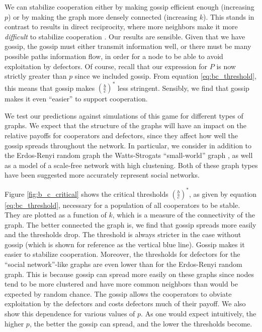 \documentclass{article}
\renewcommand{\=}[1]{\stackrel{#1}{=}} %
\begin{document}
We can stabilize cooperation either by making gossip efficient enough (increasing $p$) or by making the graph more densely connected (increasing $k$). This stands in contrast to results in direct reciprocity, where more neighbors make it more \emph{difficult} to stabilize cooperation \cite{ohtsuki2006simple}. Our results are sensible. Given that we have gossip, the gossip must either transmit information well, or there must be many possible paths information flow, in order for a node to be able to avoid exploitation by defectors. Of course, recall that our expression for $P$ is now strictly greater than $p$ since we included gossip. From equation \ref{eq:bc_threshold}, this means that gossip makes $\left( \frac{b}{c}\right)^*$ less stringent. Sensibly, we find that gossip makes it even ``easier'' to support cooperation. 

We test our predictions against simulations of this game for different types of graphs. We expect that the structure of the graphs will have an impact on the relative payoffs for cooperators and defectors, since they affect how well the gossip spreads throughout the network. In particular, we consider in addition to the Erdos-Renyi random graph the Watts-Strogats ``small-world'' graph \cite{watts1998collective}, as well as a model of a scale-free network \cite{holme2002growing} with high clustening. Both of these graph types have been suggested more accurately represent social networks.


Figure \ref{fig:b_c_critical} shows the critical thresholds $\left( \frac{b}{c} \right)^*$, as given by equation \ref{eq:bc_threshold}, necessary for a population of all cooperators to be stable. They are plotted as a function of $k$, which is a measure of the connectivity of the graph. The better connected the graph is, we find that gossip spreads more easily and the thresholds drop. The threshold is always stricter in the case without gossip (which is shown for reference as the vertical blue line). Gossip makes it easier to stabilize cooperation. Moreover, the thresholds for defectors for the ``social network''-like graphs are even lower than for the Erdos-Renyi random graph. This is because gossip can spread more easily on these graphs since nodes tend to be more clustered and have more common neighbors than would be expected by random chance. The gossip allows the cooperators to obviate exploitation by the defectors and costs defectors much of their payoff. We also show this dependence for various values of $p$. As one would expect intuitively, the higher $p$, the better the gossip can spread, and the lower the thresholds become.
\end{document}

